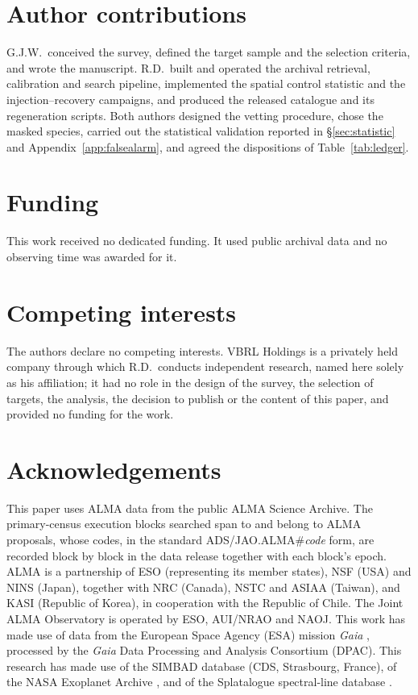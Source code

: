 \section*{Author contributions}
G.J.W.\ conceived the survey, defined the target sample and the selection
criteria, and wrote the manuscript. R.D.\ built and operated the archival
retrieval, calibration and search pipeline, implemented the spatial control
statistic and the injection--recovery campaigns, and produced the released
catalogue and its regeneration scripts. Both authors designed the vetting
procedure, chose the masked species, carried out the statistical
validation reported in \S\ref{sec:statistic} and
Appendix~\ref{app:falsealarm}, and agreed the dispositions of
Table~\ref{tab:ledger}.

\section*{Funding}
This work received no dedicated funding. It used public archival data and
no observing time was awarded for it.

\section*{Competing interests}
The authors declare no competing interests. VBRL Holdings is a privately
held company through which R.D.\ conducts independent research, named
here solely as his affiliation; it had no role in the design of the
survey, the selection of targets, the analysis, the decision to publish
or the content of this paper, and provided no funding for the work.

\section*{Acknowledgements}
This paper uses ALMA data from the public ALMA Science Archive. The \NEB{}
primary-census execution blocks searched span \PrEbDateFirst{} to
\PrEbDateLast{} and belong to \NProjCodes{} ALMA proposals, whose codes, in the
standard ADS/JAO.ALMA\#\textit{code} form, are recorded block by block in
the data release together with each block's
epoch.\ProjCodeUnresClause{} ALMA is a partnership of ESO
(representing its member states), NSF (USA) and NINS (Japan), together with NRC
(Canada), NSTC and ASIAA (Taiwan), and KASI (Republic of Korea), in cooperation
with the Republic of Chile. The Joint ALMA Observatory is operated by ESO,
AUI/NRAO and NAOJ. This work has made use of data from the European Space
Agency (ESA) mission {\it Gaia} \citep{GaiaDR3}, processed by the {\it Gaia}
Data Processing and Analysis Consortium (DPAC). This research has made use
of the SIMBAD database (CDS, Strasbourg, France), of the NASA Exoplanet
Archive \citep{NEA2013}, and of the Splatalogue spectral-line database
\citep{Splatalogue2007}.

